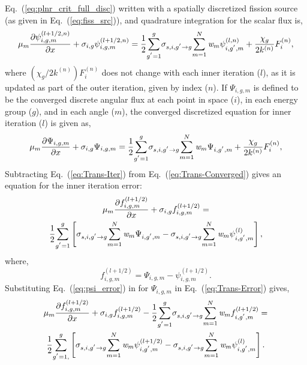 \noindent
	\indent Eq.~(\ref{eq:plnr_crit_full_disc}) written with a spatially discretized fission source (as
	given in Eq.~(\ref{eq:fiss_src})), and quadrature integration for the scalar flux is,
	\begin{equation}
		\mu_{m}\frac{\partial{{\psi}_{i,g,m}^{\left({l+1/2},{n}\right)}}}{\partial{x}}+
		{\sigma}_{i,g}{{\psi}_{i,g,m}^{\left({l+1/2},{n}\right)}} = 
		\frac{1}{2}{\sum^{g}_{g^{'}=1}}
		{\sigma}_{s,i,g^{'}\rightarrow{g}}{{\sum^{N}_{m=1}
		\emph{w}_{m}\psi_{i,g^{'},m}^{\left({l},{n}\right)}}}+
		\frac{\chi_g}{2{k^{\left({n}\right)}}}{F}_{i}^{\left(n\right)},
	\label{eq:Trans-Iter}
	\end{equation}
	where ${\left({\chi_{g}}/2{k^{\left(n\right)}}\right)}{F}_{i}^{\left(n\right)}$ does not change
	with each inner iteration (${l}$), as it is updated as part of the outer iteration, given by
	index (${n}$).  If ${\Psi_{i,g,m}}$ is defined to be the converged discrete angular flux at each
	point in space (${i}$), in each energy group (${g}$), and in each angle (${m}$), the converged
	discretized equation for inner iteration (${l}$) is given as,
	\begin{equation}
		\mu_{m}\frac{\partial{{\Psi}_{i,g,m}}}{\partial{x}}+
		{\sigma}_{i,g}{{\Psi}_{i,g,m}} = 
		\frac{1}{2}{\sum^{g}_{g^{'}=1}}
		{\sigma}_{s,i,g^{'}\rightarrow{g}}{{\sum^{N}_{m=1}
		\emph{w}_{m}\Psi_{i,g^{'},m}}}+
		\frac{\chi_g}{2{k^{\left({n}\right)}}}{F}_{i}^{\left(n\right)},
	\label{eq:Trans-Converged}
	\end{equation}
	Subtracting Eq.~(\ref{eq:Trans-Iter}) from Eq.~(\ref{eq:Trans-Converged}) gives an equation 
	for the inner iteration error:
	\begin{multline}
		\mu_{m}\frac{\partial{{f}_{i,g,m}^{\left({l+1/2}\right)}}}{\partial{x}}+
		{\sigma}_{i,g}{{f}_{i,g,m}^{\left({l+1/2}\right)}} = \\
		\frac{1}{2}{\sum^{g}_{g^{'}=1}}
		 \left[ {\sigma}_{s,i,g^{'}\rightarrow{g}}{{\sum^{N}_{m=1}
		\emph{w}_{m}\Psi_{i,g^{'},m}}}-
		{\sigma}_{s,i,g^{'}\rightarrow{g}}{{\sum^{N}_{m=1}
		\emph{w}_{m}\psi_{i,g^{'},m}^{\left({l}\right)}}}\right],
	\label{eq:Trans-Error}
	\end{multline}
	where, 
	\begin{equation}
		{f}_{i,g,m}^{\left(l+1/2\right)} = \Psi_{i,g,m} - \psi_{i,g,m}^{\left(l+1/2\right)}.
	\label{eq:psi_error}
	\end{equation}
	Substituting Eq.~(\ref{eq:psi_error}) in for ${\Psi_{i,g,m}}$ in Eq.~(\ref{eq:Trans-Error})
	gives,
	\begin{multline}
		\mu_{m}\frac{\partial{{f}_{i,g,m}^{\left({l+1/2}\right)}}}{\partial{x}}+
		{\sigma}_{i,g}{{f}_{i,g,m}^{\left({l+1/2}\right)}} - 
		\frac{1}{2}{\sum^{g}_{g^{'}=1}}
		 {\sigma}_{s,i,g^{'}\rightarrow{g}}{{\sum^{N}_{m=1}
		\emph{w}_{m}{f}_{i,g^{'},m}^{\left({l+1/2}\right)}}} = \\
		 \frac{1}{2}{\sum^{g}_{g^{'}=1,}}\left[ {\sigma}_{s,i,g^{'}\rightarrow{g}}
		{{\sum^{N}_{m=1}\emph{w}_{m}\psi_{i,g^{'},m}^{\left(l+1/2\right)}}}-
		{\sigma}_{s,i,g^{'}\rightarrow{g}}{{\sum^{N}_{m=1}
		\emph{w}_{m}\psi_{i,g^{'},m}^{\left({l}\right)}}}\right].
	\label{eq:Trans-Error2}
	\end{multline}
